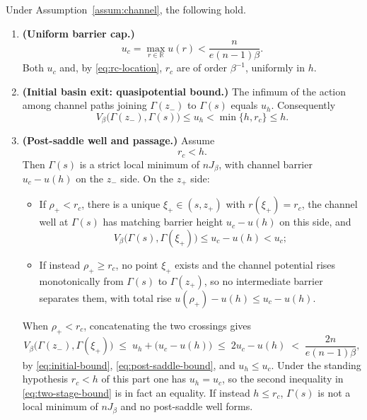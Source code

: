 \documentclass{opt2026} %
\newcommand{\R}{\mathbb{R}}
\begin{document}
\begin{theorem}
\label{thm:transition-time}
Under Assumption~\ref{assum:channel}, the following hold.
\begin{enumerate}
    \item \textbf{(Uniform barrier cap.)}
    \begin{equation}
        u_c=\max_{r\in\R}u(r)<\frac{n}{e(n-1)\beta}.
        \label{eq:barrier-cap-appendix}
    \end{equation}
    Both $u_c$ and, by \eqref{eq:rc-location}, $r_c$ are of order $\beta^{-1}$, uniformly in $h$.

    \item \textbf{(Initial basin exit: quasipotential bound.)}
    The infimum of the action among channel paths joining $\Gamma(z_-)$ to $\Gamma(s)$ equals $u_h$. Consequently
    \begin{equation}
        V_\beta\bigl(\Gamma(z_-),\Gamma(s)\bigr)\le u_h<\min\{h,r_c\}\le h.
        \label{eq:initial-bound}
    \end{equation}

    \item \textbf{(Post-saddle well and passage.)}
    Assume
    \begin{equation}
        r_c<h.
        \label{eq:high-barrier-regime}
    \end{equation}
    Then $\Gamma(s)$ is a strict local minimum of $nJ_\beta$, with channel barrier $u_c-u(h)$ on the $z_-$ side. On the $z_+$ side:
    \begin{itemize}
        \item If $\rho_+<r_c$, there is a unique $\xi_+\in(s,z_+)$ with $r(\xi_+)=r_c$, the channel well at $\Gamma(s)$ has matching barrier height $u_c-u(h)$ on this side, and
        \begin{equation}
            V_\beta\bigl(\Gamma(s),\Gamma(\xi_+)\bigr)\le u_c-u(h)<u_c;
            \label{eq:post-saddle-bound}
        \end{equation}
        \item If instead $\rho_+\ge r_c$, no point $\xi_+$ exists and the channel potential rises monotonically from $\Gamma(s)$ to $\Gamma(z_+)$, so no intermediate barrier separates them, with total rise $u(\rho_+)-u(h)\le u_c-u(h)$.
    \end{itemize}
    When $\rho_+<r_c$, concatenating the two crossings gives
    \begin{equation}
        V_\beta\bigl(\Gamma(z_-),\Gamma(\xi_+)\bigr) \;\le\; u_h+\bigl(u_c-u(h)\bigr) \;\le\; 2u_c-u(h) \;<\; \frac{2n}{e(n-1)\beta},
        \label{eq:two-stage-bound}
    \end{equation}
    by \eqref{eq:initial-bound}, \eqref{eq:post-saddle-bound}, and $u_h\le u_c$. Under the standing hypothesis $r_c<h$ of this part one has $u_h=u_c$, so the second inequality in \eqref{eq:two-stage-bound} is in fact an equality.
    If instead $h\le r_c$, $\Gamma(s)$ is not a local minimum of $nJ_\beta$ and no post-saddle well forms.
\end{enumerate}
\end{theorem}
\end{document}
